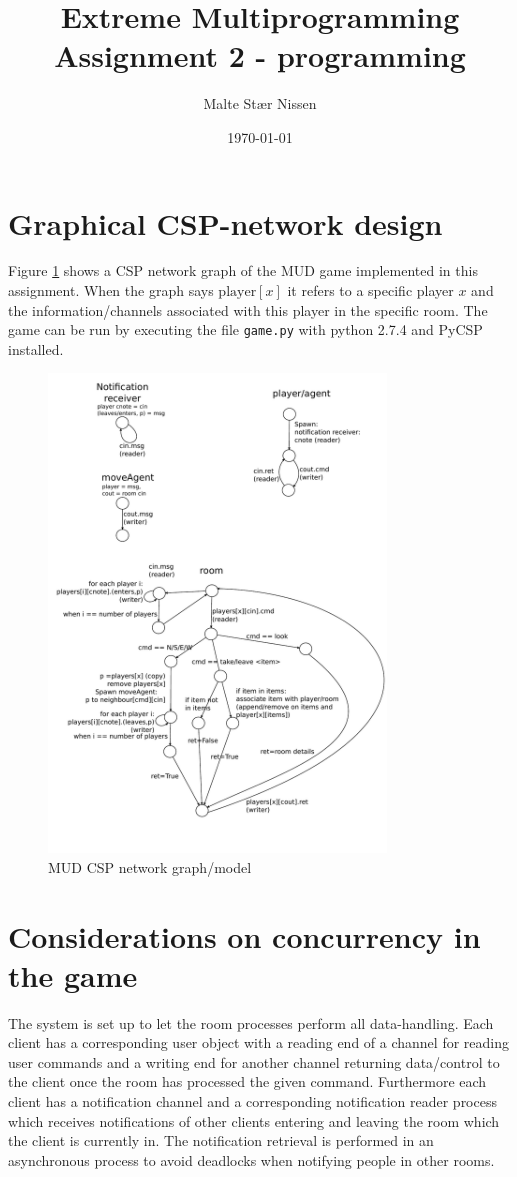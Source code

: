 \documentclass[11pt,a4paper]{article}
\title{Extreme Multiprogramming\\Assignment 2 - programming}
\author{Malte Stær Nissen}
\begin{document}
\date{\today}

\maketitle
\section{Graphical CSP-network design}
Figure \ref{fig:model} shows a CSP network graph of the MUD game implemented in
this assignment. When the graph says $\text{player}[x]$ it refers to a
specific player $x$ and the information/channels associated with this player in
the specific room. The game can be run by executing the file \texttt{game.py}
with python 2.7.4 and PyCSP installed.
\begin{figure}
    \centering
    \includegraphics[width=0.8\textwidth]{network.pdf}
    \caption{MUD CSP network graph/model}
    \label{fig:model}
\end{figure}
\section{Considerations on concurrency in the game}
The system is set up to let the room processes perform all data-handling.
Each client has a corresponding user object with a reading end of a channel
for reading user commands and a writing end for another channel returning
data/control to the client once the room has processed the given command.
Furthermore each client has a notification channel and a corresponding
notification reader process which receives notifications of other clients
entering and leaving the room which the client is currently in. The
notification retrieval is performed in an asynchronous process to avoid
deadlocks when notifying people in other rooms.
\end{document}
